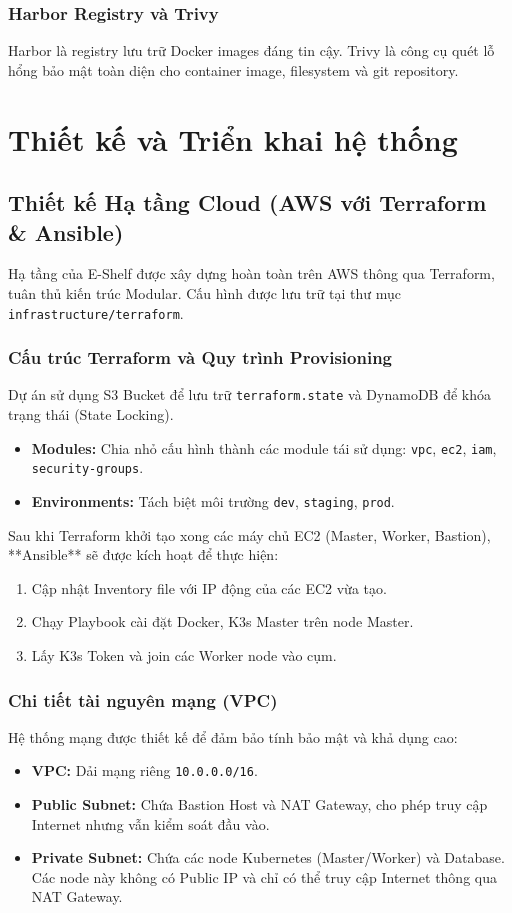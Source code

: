 \documentclass[12pt, a4paper]{article}
\begin{document}
\subsubsection{Harbor Registry và Trivy}
Harbor là registry lưu trữ Docker images đáng tin cậy. Trivy là công cụ quét lỗ hổng bảo mật toàn diện cho container image, filesystem và git repository.

\section{Thiết kế và Triển khai hệ thống}

\subsection{Thiết kế Hạ tầng Cloud (AWS với Terraform \& Ansible)}
Hạ tầng của E-Shelf được xây dựng hoàn toàn trên AWS thông qua Terraform, tuân thủ kiến trúc Modular. Cấu hình được lưu trữ tại thư mục \texttt{infrastructure/terraform}.

\subsubsection{Cấu trúc Terraform và Quy trình Provisioning}
Dự án sử dụng S3 Bucket để lưu trữ \texttt{terraform.state} và DynamoDB để khóa trạng thái (State Locking).
\begin{itemize}
    \item \textbf{Modules:} Chia nhỏ cấu hình thành các module tái sử dụng: \texttt{vpc}, \texttt{ec2}, \texttt{iam}, \texttt{security-groups}.
    \item \textbf{Environments:} Tách biệt môi trường \texttt{dev}, \texttt{staging}, \texttt{prod}.
\end{itemize}

Sau khi Terraform khởi tạo xong các máy chủ EC2 (Master, Worker, Bastion), **Ansible** sẽ được kích hoạt để thực hiện:
\begin{enumerate}
    \item Cập nhật Inventory file với IP động của các EC2 vừa tạo.
    \item Chạy Playbook cài đặt Docker, K3s Master trên node Master.
    \item Lấy K3s Token và join các Worker node vào cụm.
\end{enumerate}

\subsubsection{Chi tiết tài nguyên mạng (VPC)}
Hệ thống mạng được thiết kế để đảm bảo tính bảo mật và khả dụng cao:
\begin{itemize}
    \item \textbf{VPC:} Dải mạng riêng \texttt{10.0.0.0/16}.
    \item \textbf{Public Subnet:} Chứa Bastion Host và NAT Gateway, cho phép truy cập Internet nhưng vẫn kiểm soát đầu vào.
    \item \textbf{Private Subnet:} Chứa các node Kubernetes (Master/Worker) và Database. Các node này không có Public IP và chỉ có thể truy cập Internet thông qua NAT Gateway.
\end{itemize}
\end{document}
